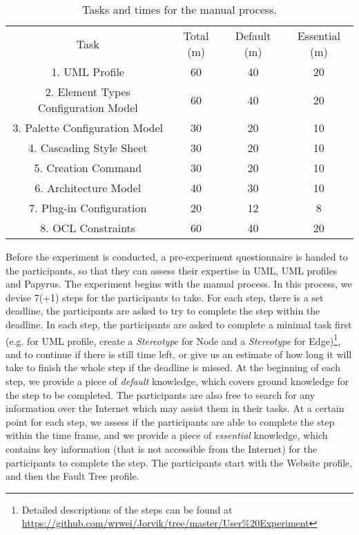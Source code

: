 \begin{table}[ht!]
	\centering
	\setlength{\tabcolsep}{3.5pt} 
	\begin{tabular}{|c|c|c|c|}
		Task & Total (m) & Default (m) & Essential (m) \\ 
		1. UML Profile & 60 & 40 & 20 \\
		2. Element Types Configuration Model & 60 & 40 & 20 \\
		3. Palette Configuration Model & 30 & 20 & 10 \\
		4. Cascading Style Sheet & 30 & 20 & 10 \\
		5. Creation Command & 30 & 20 & 10 \\
		6. Architecture Model & 40 & 30 & 10 \\
		7. Plug-in Configuration & 20 & 12 & 8 \\
		8. OCL Constraints & 60 & 40 & 20 \\
	\end{tabular}
	\caption{Tasks and times for the manual process.}
	\label{tab:manual}
\end{table}

Before the experiment is conducted, a pre-experiment questionnaire is handed to the participants, so that they can assess their expertise in UML, UML profiles and Papyrus.
The experiment begins with the manual process.
In this process, we devise 7(+1) steps for the participants to take.
For each step, there is a set deadline, the participants are asked to try to complete the step within the deadline.
In each step, the participants are asked to complete a minimal task first (e.g. for UML profile, create a \textit{Stereotype} for Node and a \textit{Stereotype} for Edge)\footnote{Detailed descriptions of the steps can be found at \url{https://github.com/wrwei/Jorvik/tree/master/User\%20Experiment}}, and to continue if there is still time left, or give us an estimate of how long it will take to finish the whole step if the deadline is missed.
At the beginning of each step, we provide a piece of \textit{default} knowledge, which covers ground knowledge for the step to be completed.
The participants are also free to search for any information over the Internet which may assist them in their tasks.
At a certain point for each step, we assess if the participants are able to complete the step within the time frame, and we provide a piece of \textit{essential} knowledge, which contains key information (that is not accessible from the Internet) for the participants to complete the step.
The participants start with the Website profile, and then the Fault Tree profile.

